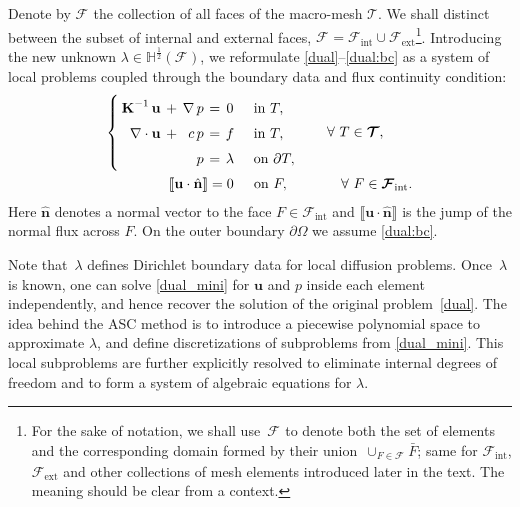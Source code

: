 \documentclass[12pt]{article}
\newcommand{\vect}[1]{\boldsymbol{\mathbf{#1}}}
\newcommand{\bcell}{T}
\newcommand{\bmesh}{{\vect{\mathcal T}}}
\newcommand{\bface}{F}
\newcommand{\bfaces}[1][]{{\vect{\mathcal F}_{\text{#1}}}}
\newcommand{\HHalfSpace}[1][\bface]{{\mathbb H^{\frac{1}{2}}\left({#1}\right)}}
\begin{document}
	Denote by $\bfaces$ the collection of all faces of the macro-mesh $\bmesh$. We shall distinct between the subset of internal and external faces,  $\bfaces = \bfaces[int] \cup \bfaces[ext]$\footnote{For the sake of  notation, we shall use~$\bfaces$ to denote both the set of elements and the corresponding domain formed by their union~$\cup_{F\in \bfaces} \bar{F}$; same for $\bfaces[int]$, $\bfaces[ext]$ and other collections of mesh elements introduced later in the text. The meaning should be clear from a context.}.
	Introducing the new unknown $\lambda \in \HHalfSpace[\bfaces]$, we reformulate \eqref{dual}--\eqref{dual:bc} as a system of local problems coupled through the boundary data
	and flux continuity condition:
	\begin{eqnarray}
		\arraycolsep=2pt\def\arraystretch{1.5}
		\left\{\begin{array}{rcrccl}
			\vect K^{-1}\,\vect u                    & + & \nabla\,p & = & 0       &\quad\text{in } \bcell, \\
			\nabla\cdot\vect u                       & + & c\,p      & = & f       &\quad\text{in } \bcell, \\
			                                         &   & p         & = & \lambda &\quad\text{on } \partial\bcell, %
		\end{array}\right. 
		& \qquad \forall~\bcell\in\bmesh, \label{dual_mini} \\
		\llbracket\vect u \cdot \hat{\vect n}\rrbracket = 0\quad\:\:\text{on } F,\:\:\:\:
		& \qquad\quad \forall~F\in\bfaces[int]. \label{flux_cond}
	\end{eqnarray}
	Here $\hat{\vect n}$ denotes a normal vector to the face $F\in\bfaces[int]$ and $\llbracket \vect u\cdot\hat{\vect n} \rrbracket$ is the jump of the normal flux across $F$. On the outer boundary $\partial\Omega$ we assume \eqref{dual:bc}.
	
	Note that~$\lambda$ defines Dirichlet boundary data for local diffusion problems. Once~$\lambda$ is known, one can solve \eqref{dual_mini} for $\vect u$ and $p$ inside each element independently, and hence recover the solution of the original problem~\eqref{dual}. The idea behind the ASC method is to introduce a piecewise polynomial space to approximate $\lambda$, and  define discretizations of subproblems from \eqref{dual_mini}. This local subproblems are further explicitly resolved to eliminate internal degrees of freedom and to form a system of algebraic equations for $\lambda$.
	
\end{document}
